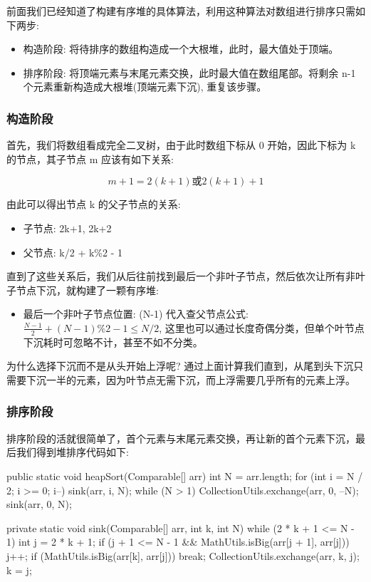 前面我们已经知道了构建有序堆的具体算法，利用这种算法对数组进行排序只需如下两步:
\begin{itemize}
    \item 构造阶段: 将待排序的数组构造成一个大根堆，此时，最大值处于顶端。
    \item 排序阶段: 将顶端元素与末尾元素交换，此时最大值在数组尾部。将剩余 n-1 个元素重新构造成大根堆(顶端元素下沉), 重复该步骤。
\end{itemize}

\subsubsection{构造阶段}

首先，我们将数组看成完全二叉树，由于此时数组下标从 0 开始，因此下标为 k 的节点，其子节点 m 应该有如下关系:

$$ m+1 = 2(k+1) \text{或} 2(k+1)+1 $$

由此可以得出节点 k 的父子节点的关系:
\begin{itemize}
    \item 子节点: 2k+1, 2k+2
    \item 父节点: k/2 + k\%2 - 1
\end{itemize}

直到了这些关系后，我们从后往前找到最后一个非叶子节点，然后依次让所有非叶子节点下沉，就构建了一颗有序堆:
\begin{itemize}
    \item 最后一个非叶子节点位置: (N-1) 代入查父节点公式: $\frac{N-1}{2} + (N-1)\%2 -1 \le N/2$, 这里也可以通过长度奇偶分类，但单个叶节点下沉耗时可忽略不计，甚至不如不分类。
\end{itemize}

为什么选择下沉而不是从头开始上浮呢? 通过上面计算我们直到，从尾到头下沉只需要下沉一半的元素，因为叶节点无需下沉，而上浮需要几乎所有的元素上浮。

\subsubsection{排序阶段}

排序阶段的活就很简单了，首个元素与末尾元素交换，再让新的首个元素下沉，最后我们得到堆排序代码如下:

\begin{Java}
public static void heapSort(Comparable[] arr) {
    int N = arr.length;
    for (int i = N / 2; i >= 0; i--)
        sink(arr, i, N);
    while (N > 1) {
        CollectionUtils.exchange(arr, 0, --N);
        sink(arr, 0, N);
    }
}

private static void sink(Comparable[] arr, int k, int N) {
    while (2 * k + 1 <= N - 1) {
        int j = 2 * k + 1;
        if (j + 1 <= N - 1 && MathUtils.isBig(arr[j + 1], arr[j]))
            j++;
        if (MathUtils.isBig(arr[k], arr[j])) break;
        CollectionUtils.exchange(arr, k, j);
        k = j;
    }
}
\end{Java}

